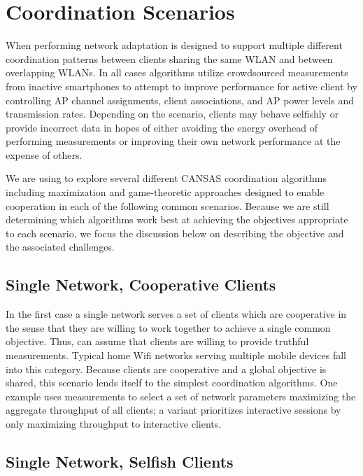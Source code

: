 \section{Coordination Scenarios}
\label{sec-algorithms}

When performing network adaptation \PS{} is designed to support multiple
different coordination patterns between clients sharing the same WLAN and
between overlapping WLANs. In all cases \PS{} algorithms utilize crowdsourced
measurements from inactive smartphones to attempt to improve performance for
active client by controlling AP channel assignments, client associations, and
AP power levels and transmission rates. Depending on the scenario, clients
may behave selfishly or provide incorrect data in hopes of either avoiding
the energy overhead of performing measurements or improving their own network
performance at the expense of others.

We are using \PS{} to explore several different CANSAS coordination
algorithms including maximization and game-theoretic approaches designed to
enable cooperation in each of the following common scenarios. Because we are
still determining which algorithms work best at achieving the objectives
appropriate to each scenario, we focus the discussion below on describing the
objective and the associated challenges.

\subsection{Single Network, Cooperative Clients}

In the first case a single network serves a set of clients which are
cooperative in the sense that they are willing to work together to achieve a
single common objective. Thus, \PS{} can assume that clients are willing to
provide truthful measurements. Typical home Wifi networks serving multiple
mobile devices fall into this category. Because clients are cooperative and a
global objective is shared, this scenario lends itself to the simplest
coordination algorithms. One example uses \PS{} measurements to select a set
of network parameters maximizing the aggregate throughput of all clients; a
variant prioritizes interactive sessions by only maximizing throughput to
interactive clients.

\subsection{Single Network, Selfish Clients}

